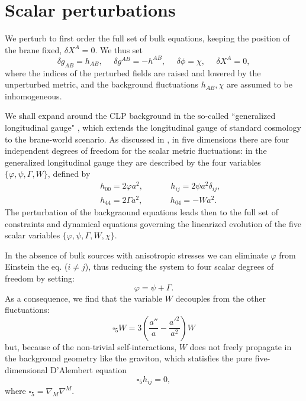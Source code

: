 \documentclass[a4paper,12pt]{article}
\begin{document}
\section{Scalar perturbations}

We perturb to first order the full set of bulk equations, keeping
the position of the brane fixed, $\delta X^A=0$. We thus set
\begin{equation}
\delta g_{AB}=h_{AB}, ~~~~~~ \delta g^{AB}=-h^{AB}, ~~~~~~
\delta\phi=\chi , ~~~~~~ \delta X^A=0, \label{Pert dil}
\end{equation}
where the indices of the perturbed fields are raised and lowered
by the unperturbed metric, and the background fluctuations
$h_{AB}, \chi$ are assumed to be inhomogeneous.

We shall expand around the CLP background  in the so-called
``generalized longitudinal gauge" \cite{BDBL}, which extends the
longitudinal gauge of standard cosmology \cite{MBF} to the
brane-world scenario. As discussed in \cite{BDBL}, in five
dimensions there are four independent degrees of freedom for the
scalar metric fluctuations: in the generalized longitudinal gauge
they are described by the four variables $\{ \varphi, \psi,
\Gamma, W\}$, defined by
\begin{eqnarray}
&& h_{00}= 2 \varphi a^2, ~~~~~~~~~~~~~~~ h_{ij}=2\psi a^2
\delta_{ij}, \nonumber\\ && h_{44}= 2 \Gamma a^2, ~~~~~~~~~~~~~~~
h_{04}=-W a^2. \label{38}
\end{eqnarray}
The perturbation of the backgraound equations leads then to the full set
of constraints and dynamical equations governing the linearized
evolution of the five scalar variables $\{ \varphi, \psi, \Gamma,
W,\chi\}$.

In the absence of bulk sources with anisotropic stresses we
can eliminate $\varphi$ from Einstein the eq. ($i \not=j$), thus reducing
the system to four scalar degrees of freedom by setting:
\begin{equation}
\varphi=\psi+\Gamma. \label{318}
\end{equation}
As a consequence, we find that the variable $W$
decouples from the other fluctuations:
\begin{equation}
\square_5 W=3\left( \frac{a''}{a}-\frac{a'^2}{a^2} \right)W
\label{319}
\end{equation}
but, because of the non-trivial self-interactions, $W$ does not freely
propagate in the background geometry like the graviton, which
statisfies the pure  five-dimensional D'Alembert equation
\begin{equation}
\square_5 h_{ij}=0 \label{Eq libera},
\end{equation}
 where $\square_5  = \nabla_M \nabla^M$.
\end{document}
